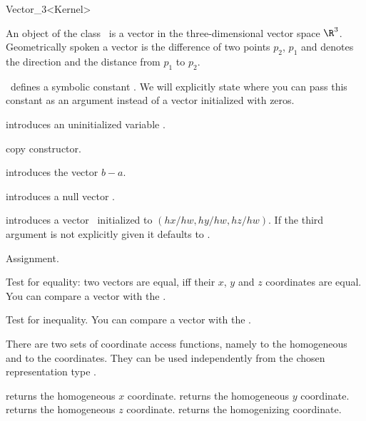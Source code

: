 \begin{ccRefClass} {Vector_3<Kernel>}

\ccDefinition

An object of the class \ccRefName\ is a vector in the three-dimensional 
vector space $\R^3$. Geometrically spoken a vector is the difference
of two points $p_2$, $p_1$ and denotes the direction and the distance
from   $p_1$ to $p_2$. 

\cgal\ defines a symbolic constant . We 
will explicitly state where you can pass this constant as an argument
instead of a vector initialized with zeros.


\ccCreation
{}


\ccHidden{}
             {introduces an uninitialized variable \ccVar.}

\ccHidden {}
 	    {copy constructor.}

 	    {introduces the vector $b-a$.}

 	    {introduces a null vector \ccVar.}

            {introduces a vector \ccVar\ initialized to $(hx/hw, hy/hw, hz/hw)$.
             If the third argument is not explicitly given it defaults
             to .}


\ccOperations

\ccHidden {}
        {Assignment.}

       {Test for equality: two vectors are equal, iff their $x$, $y$ 
        and $z$ coordinates are equal. You can compare a vector with the
        .}

       {Test for inequality. You can compare a vector with the
        .}


There are two sets of coordinate access functions, namely to the
homogeneous and to the  coordinates. They can be used
independently from the chosen representation type .

       {returns the homogeneous $x$ coordinate.}
\ccGlue
{}
       {returns the homogeneous $y$ coordinate.}
\ccGlue
{}
       {returns the homogeneous $z$ coordinate.}
\ccGlue
{}
       {returns the homogenizing  coordinate.}


\end{ccRefClass}
